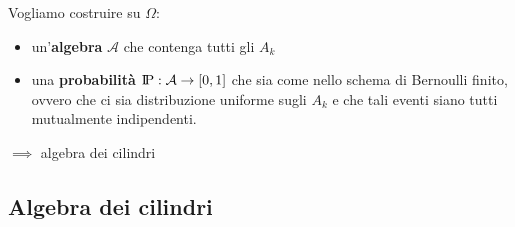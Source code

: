 \documentclass[a4paper,10pt]{article}
\newcommand{\pr}{\text{I\kern-0.15em P}} %
\theoremstyle{remark}
\theoremstyle{definition}
\begin{document}
\vspace{\baselineskip}

Vogliamo costruire su $\Omega$:
\begin{itemize}
    \item un'\textbf{algebra} $\mathcal{A}$ che contenga tutti gli $A_k$
    \item una \textbf{probabilità} $\pr: \mathcal{A} \to [0,1]$ che sia come nello schema di Bernoulli finito, ovvero che ci sia distribuzione uniforme sugli $A_k$ e che tali eventi siano tutti mutualmente indipendenti.
\end{itemize}
$\implies$ algebra dei cilindri


\subsection*{Algebra dei cilindri}
\end{document}
